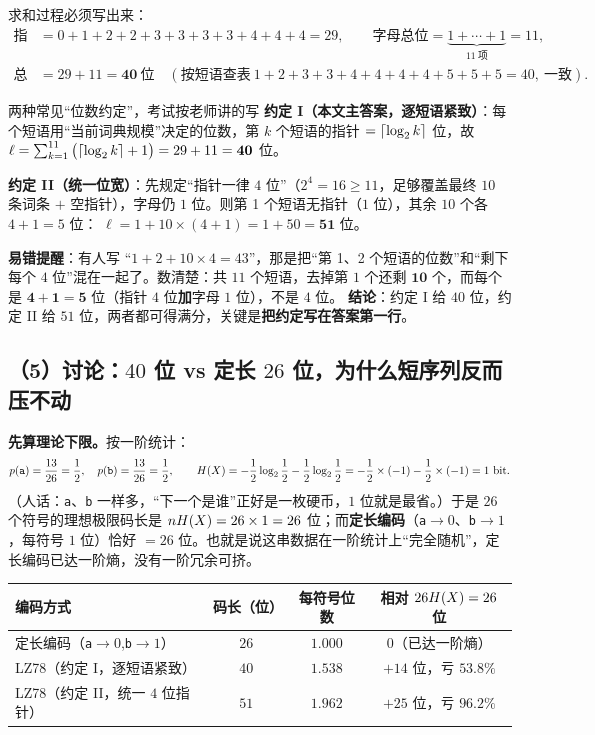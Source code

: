 \documentclass[11pt,a4paper]{ctexart}
\begin{document}
求和过程必须写出来：
\begin{align*}
\text{指针总位}&=0+1+2+2+3+3+3+3+4+4+4=29,\qquad
\text{字母总位}=\underbrace{1+\cdots+1}_{11\ \text{项}}=11,\\
\text{总位数}&=29+11=\mathbf{40}\ \text{位}\quad(\text{按短语查表}\ 1+2+3+3+4+4+4+4+5+5+5=40,\ \text{一致}).
\end{align*}

\begin{exam}{两种常见“位数约定”，考试按老师讲的写}
\textbf{约定 I（本文主答案，逐短语紧致）}：每个短语用“当前词典规模”决定的位数，第 $k$ 个短语的指针 $=\lceil\log_{2} k\rceil$ 位，故
$\ell=\sum_{k=1}^{11}\big(\lceil\log_{2} k\rceil+1\big)=29+11=\mathbf{40}$ 位。

\textbf{约定 II（统一位宽）}：先规定“指针一律 $4$ 位”（$2^4=16\ge11$，足够覆盖最终 $10$ 条词条 $+$ 空指针），字母仍 $1$ 位。则第 1 个短语无指针（$1$ 位），其余 $10$ 个各 $4+1=5$ 位：
$\ell=1+10\times(4+1)=1+50=\mathbf{51}$ 位。

\textbf{易错提醒}：有人写 “$1+2+10\times4=43$”，那是把“第 1、2 个短语的位数”和“剩下每个 $4$ 位”混在一起了。数清楚：共 $11$ 个短语，去掉第 $1$ 个还剩 $\mathbf{10}$ 个，而每个是 $\mathbf{4+1=5}$ 位（指针 $4$ 位\textbf{加}字母 $1$ 位），不是 $4$ 位。
\textbf{结论}：约定 I 给 $40$ 位，约定 II 给 $51$ 位，两者都可得满分，关键是\textbf{把约定写在答案第一行}。
\end{exam}

\subsection{（5）讨论：$40$ 位 vs 定长 $26$ 位，为什么短序列反而压不动}
\label{sec:cmp}

\textbf{先算理论下限。}按一阶统计：
\[
p\!\left(\texttt a\right)=\frac{13}{26}=\frac12,\quad p\!\left(\texttt b\right)=\frac{13}{26}=\frac12,
\qquad
H\!\left(X\right)=-\frac12\log_{2}\frac12-\frac12\log_{2}\frac12
=-\frac12\times(-1)-\frac12\times(-1)=1\ \text{bit}.
\]
（人话：\texttt a、\texttt b 一样多，“下一个是谁”正好是一枚硬币，$1$ 位就是最省。）于是 $26$ 个符号的理想极限码长是 $nH\!\left(X\right)=26\times1=26$ 位；而\textbf{定长编码}（\texttt a$\to0$、\texttt b$\to1$，每符号 $1$ 位）恰好 $=26$ 位。也就是说这串数据在一阶统计上“完全随机”，定长编码已达一阶熵，没有一阶冗余可挤。

\begin{center}
\small
\begin{tabular}{@{}l c c c@{}}
\toprule
编码方式 & 码长（位）& 每符号位数 & 相对 $26H\!\left(X\right)=26$ 位 \\
\midrule
定长编码（\texttt a$\to0$,\texttt b$\to1$） & $26$ & $1.000$ & $0$（已达一阶熵）\\
LZ78（约定 I，逐短语紧致） & $40$ & $1.538$ & $+14$ 位，亏 $53.8\%$\\
LZ78（约定 II，统一 $4$ 位指针） & $51$ & $1.962$ & $+25$ 位，亏 $96.2\%$\\
\bottomrule
\end{tabular}
\end{center}
\end{document}
